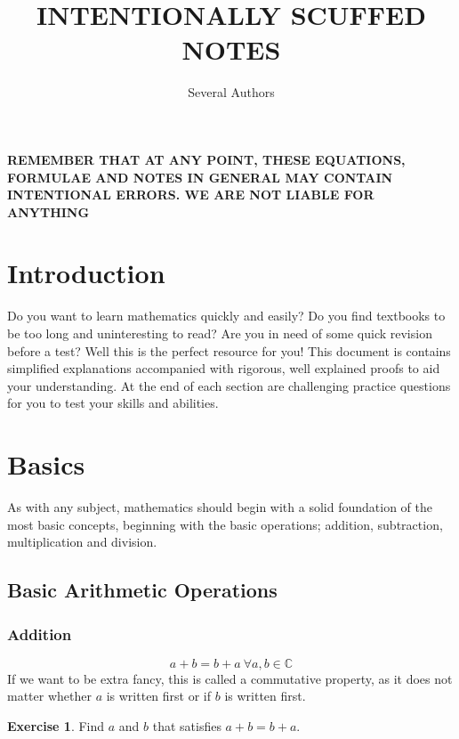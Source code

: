 \documentclass[a4paper]{article}
\theoremstyle{plain}
\theoremstyle{definition}
\newtheorem{exercise}{Exercise}[section]
\theoremstyle{remark}
\newcommand{\sectionSpace}{\vspace{2em}} %
\begin{document}
\title{INTENTIONALLY SCUFFED NOTES}
\author{Several Authors}
\maketitle
{}
\newpage


\tableofcontents
{}
\newpage

\begin{center}
    \Large 
    \textbf{
        REMEMBER THAT AT ANY POINT, THESE EQUATIONS, FORMULAE AND NOTES IN GENERAL MAY CONTAIN INTENTIONAL ERRORS. WE ARE NOT LIABLE FOR ANYTHING} 
\end{center}

\sectionSpace
\section{Introduction}
    Do you want to learn mathematics quickly and easily? Do you find textbooks to be too long and uninteresting to read? Are you in need of some quick revision before a test? Well this is the perfect resource for you! This document is contains simplified explanations accompanied with rigorous, well explained proofs to aid your understanding. At the end of each section are challenging practice questions for you to test your skills and abilities.

\sectionSpace
\section{Basics}
As with any subject, mathematics should begin with a solid foundation of the most basic concepts, beginning with the basic operations; addition, subtraction, multiplication and division.

    \subsection{Basic Arithmetic Operations}
        \subsubsection{Addition}
        $$a+b=b+a \ \forall a, b \in \mathbb{C}$$
        If we want to be extra fancy, this is called a commutative property, as it does not matter whether $a$ is written first or if $b$ is written first. 

        \begin{exercise}
            Find $a$ and $b$ that satisfies $a+b=b+a$.
        \end{exercise}
\end{document}
